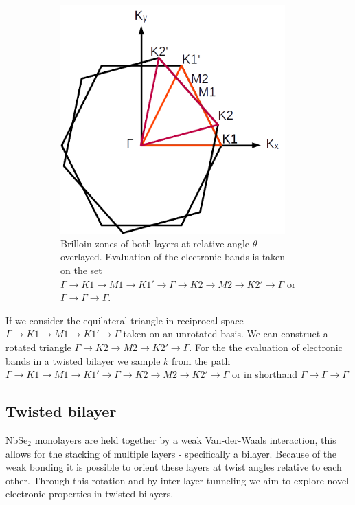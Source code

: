 \documentclass[12pt]{report} %
\begin{document}
\begin{figure}[t]
\begin{subfigure}[t]{0.45\textwidth}
    \includegraphics[width=0.95\textwidth]{heterostructure_BZ_path.png}
    \caption{
      Brilloin zones of both layers at relative angle $\theta$ overlayed. Evaluation of the electronic bands is taken on the set $\Gamma \rightarrow K1 \rightarrow M1 \rightarrow K1' \rightarrow \Gamma \rightarrow K2 \rightarrow M2 \rightarrow K2' \rightarrow \Gamma$ or $\Gamma \rightarrow \Gamma \rightarrow \Gamma$.
    }
  \end{subfigure}
  \caption{
  }
\end{figure}

  If we consider the equilateral triangle in reciprocal space $\Gamma \rightarrow K1 \rightarrow M1 \rightarrow K1' \rightarrow \Gamma$ taken on an unrotated basis. We can construct a rotated triangle $\Gamma \rightarrow K2 \rightarrow M2 \rightarrow K2' \rightarrow \Gamma$. For the the evaluation of electronic bands in a twisted bilayer we sample $k$ from the path $\Gamma \rightarrow K1 \rightarrow M1 \rightarrow K1' \rightarrow \Gamma \rightarrow K2 \rightarrow M2 \rightarrow K2' \rightarrow \Gamma$ or in shorthand $\Gamma \rightarrow \Gamma \rightarrow \Gamma$

\subsection*{Twisted bilayer}

  NbSe$_2$ monolayers are held together by a weak Van-der-Waals interaction, this allows for the stacking of multiple layers - specifically a bilayer. Because of the weak bonding it is possible to orient these layers at twist angles relative to each other. Through this rotation and by inter-layer tunneling we aim to explore novel electronic properties in twisted bilayers.
\end{document}
